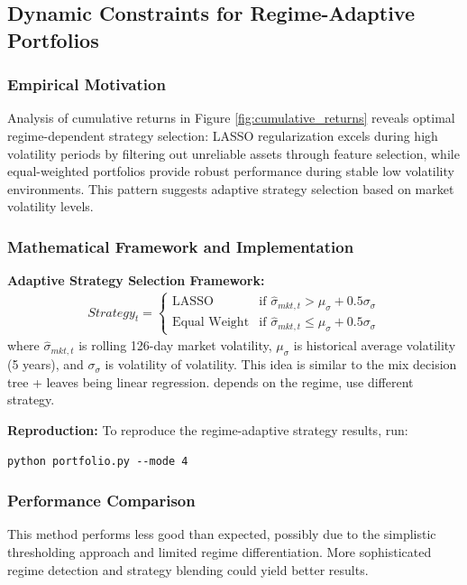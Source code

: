 \documentclass[12pt]{article}
\begin{document}
\subsection{Dynamic Constraints for Regime-Adaptive Portfolios}

\subsubsection{Empirical Motivation}
Analysis of cumulative returns in Figure \ref{fig:cumulative_returns} reveals optimal regime-dependent strategy selection: LASSO regularization excels during high volatility periods by filtering out unreliable assets through feature selection, while equal-weighted portfolios provide robust performance during stable low volatility environments. This pattern suggests adaptive strategy selection based on market volatility levels.

\subsubsection{Mathematical Framework and Implementation}
\textbf{Adaptive Strategy Selection Framework:}
\begin{align}
Strategy_t = \begin{cases}
\text{LASSO} & \text{if } \hat{\sigma}_{mkt,t} > \mu_{\sigma} + 0.5\sigma_{\sigma} \\
\text{Equal Weight} & \text{if } \hat{\sigma}_{mkt,t} \leq \mu_{\sigma} + 0.5\sigma_{\sigma}
\end{cases}
\end{align}
where $\hat{\sigma}_{mkt,t}$ is rolling 126-day market volatility, $\mu_{\sigma}$ is historical average volatility (5 years), and $\sigma_{\sigma}$ is volatility of volatility. This idea is similar to the mix decision tree + leaves being linear regression. depends on the regime, use different strategy.

\textbf{Reproduction:}
To reproduce the regime-adaptive strategy results, run:
\begin{lstlisting}
python portfolio.py --mode 4
\end{lstlisting}

\subsubsection{Performance Comparison}
This method performs less good than expected, possibly due to the simplistic thresholding approach and limited regime differentiation. More sophisticated regime detection and strategy blending could yield better results.
\end{document}
